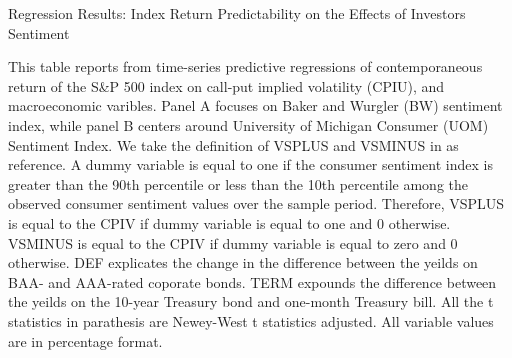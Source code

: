 


\begin{table}[h]

\caption{Regression Results: Index Return Predictability on the Effects of Investors Sentiment}\label{table:sentiment}
\begin{threeparttable}

\medskip

{\scriptsize 
This table reports from time-series predictive regressions of contemporaneous return of the S\&P 500 index on call-put implied volatility (CPIU), and macroeconomic varibles. Panel A focuses on Baker and Wurgler (BW) sentiment index, while panel B centers around University of Michigan Consumer (UOM) Sentiment Index. We take the definition of VSPLUS and VSMINUS in \textcite{atilgan2015implied} as reference. A dummy variable is equal to one if the consumer sentiment index is greater than the 90th percentile or less than the 10th percentile among the observed consumer sentiment values over the sample period. Therefore, VSPLUS is equal to the CPIV if dummy variable is equal to one and 0 otherwise. VSMINUS is equal to the CPIV if dummy variable is equal to zero and 0 otherwise. DEF explicates the change in the difference between the yeilds on BAA- and AAA-rated coporate bonds. TERM expounds the difference between the yeilds on the 10-year Treasury bond and one-month Treasury bill. All the t statistics in parathesis are Newey-West t statistics adjusted. All variable values are in percentage format.  
}
\medskip


\begin{subtable}[t]{\linewidth}


\end{subtable}
\end{threeparttable}
\end{table}
